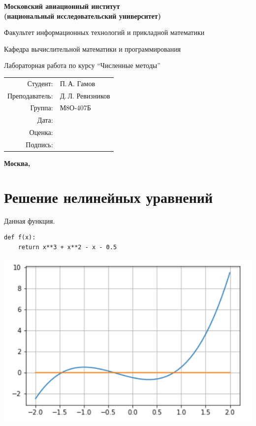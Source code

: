 \documentclass[pdf, unicode, 12pt, a4paper,oneside,fleqn]{article}
\begin{document}
\begin{titlepage}
\begin{center}
\bfseries
{\Large Московский авиационный институт\\ (национальный исследовательский университет)}

\vspace{48pt}
{\large Факультет информационных технологий и прикладной математики}

\vspace{36pt}
{\large Кафедра вычислительной математики и программирования}

\vspace{48pt}Лабораторная работа  по курсу 
\enquote{Численные методы}
\end{center}
\vspace{72pt}

\begin{flushright}
\begin{tabular}{rl}
Студент: & П.\,А. Гамов \\
Преподаватель: & Д.\,Л. Ревизников \\
Группа: & М8О-407Б \\
Дата: & \\
Оценка: & \\
Подпись: & \\
\end{tabular}
\end{flushright}
\vfill
\begin{center}
\bfseries
Москва, \the\year
\end{center}
\end{titlepage}

\pagebreak

\section{Решение нелинейных уравнений}

Данная функция.
\begin{lstlisting}
def f(x):
    return x**3 + x**2 - x - 0.5
\end{lstlisting}

\includegraphics[scale=0.6]{data2lab.png}
\end{document}

